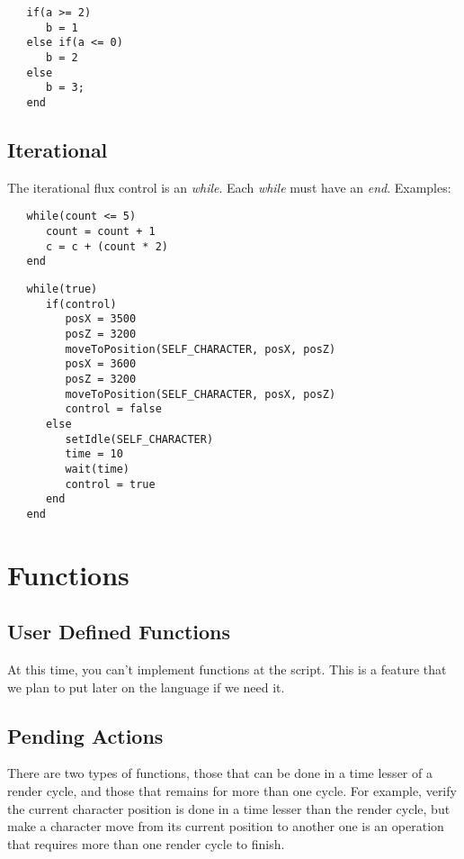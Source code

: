 \documentclass[ letterpaper,12pt]{article}
\begin{document}
\begin{verbatim}
   if(a >= 2)
      b = 1
   else if(a <= 0)
      b = 2
   else
      b = 3;
   end
\end{verbatim}

\subsection{Iterational}

The iterational flux control is an {\it while}. Each {\it while} must have an
{\it end}. Examples:

\begin{verbatim}
   while(count <= 5)
      count = count + 1
      c = c + (count * 2)
   end
\end{verbatim}

\begin{verbatim}
   while(true)
      if(control)
         posX = 3500
         posZ = 3200
         moveToPosition(SELF_CHARACTER, posX, posZ)
         posX = 3600
         posZ = 3200
         moveToPosition(SELF_CHARACTER, posX, posZ)
         control = false
      else
         setIdle(SELF_CHARACTER)
         time = 10
         wait(time)
         control = true
      end
   end
\end{verbatim}


\section{Functions}


\subsection{User Defined Functions}

   At this time, you can't implement functions at the script. This is a feature
that we plan to put later on the language if we need it.

\subsection{Pending Actions}

   There are two types of functions, those that can be done in a time lesser of
a render cycle, and those that remains for more than one cycle. For example,
verify the current character position is done in a time lesser than the render
cycle, but make a character move from its current position to another one is an
operation that requires more than one render cycle to finish.
\end{document}
